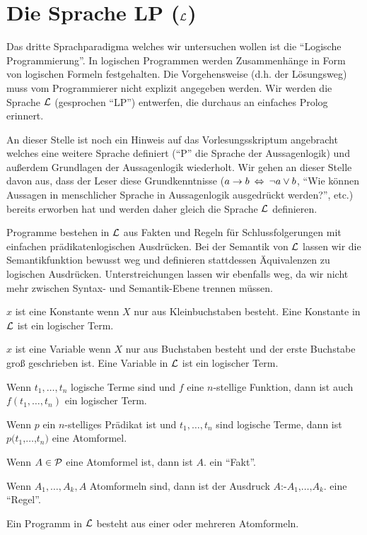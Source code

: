 \section{Die Sprache LP ($\mathcal{L}$)}
Das dritte Sprachparadigma welches wir untersuchen wollen ist die ``Logische Programmierung''.
In logischen Programmen werden Zusammenhänge in Form von logischen Formeln festgehalten.
Die Vorgehensweise (d.h. der Lösungsweg) muss vom Programmierer nicht explizit angegeben werden.
Wir werden die Sprache $\mathcal{L}$ (gesprochen ``LP'') entwerfen, die durchaus an einfaches Prolog erinnert.

An dieser Stelle ist noch ein Hinweis auf das Vorlesungsskriptum angebracht welches eine weitere Sprache
definiert (``P'' die Sprache der Aussagenlogik) und außerdem Grundlagen der Aussagenlogik wiederholt. Wir
gehen an dieser Stelle davon aus, dass der Leser diese Grundkenntnisse ($a \to b \:\Leftrightarrow\: \neg a \vee b$, ``Wie können Aussagen in menschlicher Sprache in Aussagenlogik ausgedrückt werden?'', etc.) bereits erworben hat
und werden daher gleich die Sprache $\mathcal{L}$ definieren.

Programme bestehen in $\mathcal{L}$ aus Fakten und Regeln für Schlussfolgerungen mit einfachen prädikatenlogischen Ausdrücken.
Bei der Semantik von $\mathcal{L}$ lassen wir die Semantikfunktion bewusst weg und definieren stattdessen Äquivalenzen zu logischen Ausdrücken.
Unterstreichungen lassen wir ebenfalls weg, da wir nicht mehr zwischen Syntax- und Semantik-Ebene trennen müssen.

\begin{defn} \quad
\begin{\whichenum}
\item $x$ ist eine Konstante wenn $X$ nur aus Kleinbuchstaben besteht. Eine Konstante in $\mathcal{L}$ ist ein logischer Term.
\item $x$ ist eine Variable wenn $X$ nur aus Buchstaben besteht und der erste Buchstabe groß geschrieben ist. Eine Variable in $\mathcal{L}$ ist ein logischer Term.
\item Wenn $t_1,\ldots,t_n$ logische Terme sind und $f$ eine $n$-stellige Funktion, dann ist auch $f(t_1,\ldots,t_n)$ ein logischer Term.
\item Wenn $p$ ein $n$-stelliges Prädikat ist und $t_1,\ldots,t_n$ sind logische Terme,
dann ist $p\texttt{(}t_1\texttt{,}\ldots\texttt{,}t_n\texttt{)}$ eine Atomformel.
\item Wenn $A \in \mathcal{P}$ eine Atomformel ist, dann ist $A \texttt{.}$ ein ``Fakt''.
\item Wenn $A_1,\ldots,A_k,A$ Atomformeln sind, dann ist der Ausdruck $A  \texttt{:-}  A_1  \texttt{,}  \ldots  \texttt{,}  A_k  \texttt{.}$ eine ``Regel''.
\item Ein Programm in $\mathcal{L}$ besteht aus einer oder mehreren Atomformeln.
\end{\whichenum}
\end{defn}

